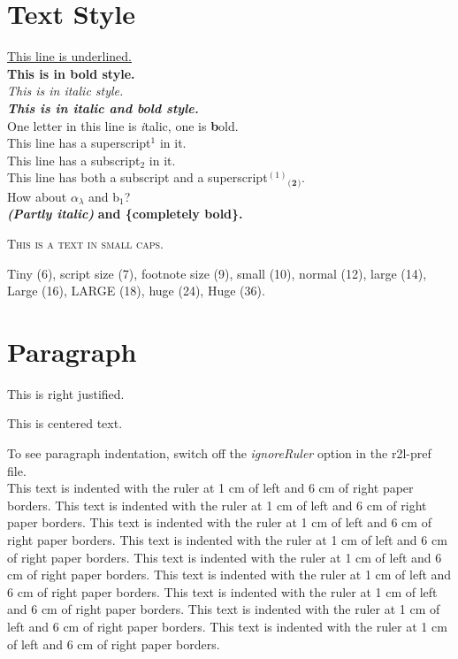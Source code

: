 \documentclass{article}
\begin{document}
\section*{Text Style}
{\underline {This line is underlined.}}\\
\textbf{This is in bold style.}\\
\textit{This is in italic style.}\\
\textbf{\textit{This is in italic and bold style.}}\\
One letter in this line is \textit{i}talic, one is \textbf{b}old.\\
This line has a superscript$^{1}$ in it.\\
This line has a subscript$_{2}$ in it.\\
This line has both a subscript and a superscript$^{(1)}$$_{(}$$_{\mathbf{2}}$$_{)}$.\\
How about \ensuremath{\alpha}$_{\ensuremath{\lambda}}$ and b$_{1}$?\\
\textbf{\textit{(Partly italic)}} \textbf{and \{completely bold\}.}


\textsc{This is a text in small caps.}

{\scriptsize Tiny (6),} {\footnotesize script size (7),} {\small footnote size (9),} small 
(10), normal (12), {\large large (14),} {\Large Large (16),} {\LARGE LARGE (18),} {\huge huge 
(24),} {\Huge Huge (36).}



\section*{Paragraph}

\begin{flushright}
This is right justified.


\end{flushright}

\begin{center}
This is centered text.


\end{center}

To see paragraph indentation, switch off the \textit{ignoreRuler} 
option in the r2l-pref file.\\
This text is indented with the ruler at 1 cm of left and 6 cm 
of right paper borders. This text is indented with the ruler at 
1 cm of left and 6 cm of right paper borders. This text is indented with 
the ruler at 1 cm of left and 6 cm of right paper borders. This 
text is indented with the ruler at 1 cm of left and 6 cm of right 
paper borders. This text is indented with the ruler at 1 cm of 
left and 6 cm of right paper borders. This text is indented with 
the ruler at 1 cm of left and 6 cm of right paper borders. This 
text is indented with the ruler at 1 cm of left and 6 cm of right 
paper borders. This text is indented with the ruler at 1 cm of 
left and 6 cm of right paper borders. This text is indented with 
the ruler at 1 cm of left and 6 cm of right paper borders.
\end{document}
